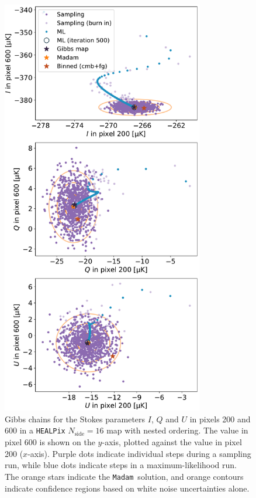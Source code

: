 \documentclass[twocolumn]{aa}
\newcommand{\Madam}{\texttt{Madam}}
\begin{document}
\begin{figure}
  \center
  \includegraphics[width=8.8cm]{figs/Fig_chain_200_600_v3.pdf}
  \caption{Gibbs chains for the Stokes parameters $I$, $Q$ and $U$ in
	pixels 200 and 600 in a \texttt{HEALPix}
    $N_{\textrm{side}}=16$ map with nested ordering. 
    The value in pixel 600 is shown on the $y$-axis, plotted against the value
    in pixel 200 ($x$-axis).
    Purple dots
    indicate individual steps during a sampling run, while blue dots
    indicate steps in a maximum-likelihood run. The orange stars
    indicate the \Madam\ solution, and orange contours indicate
    confidence regions based on white noise uncertainties alone.}\label{fig:chain}
\end{figure}
\end{document}
